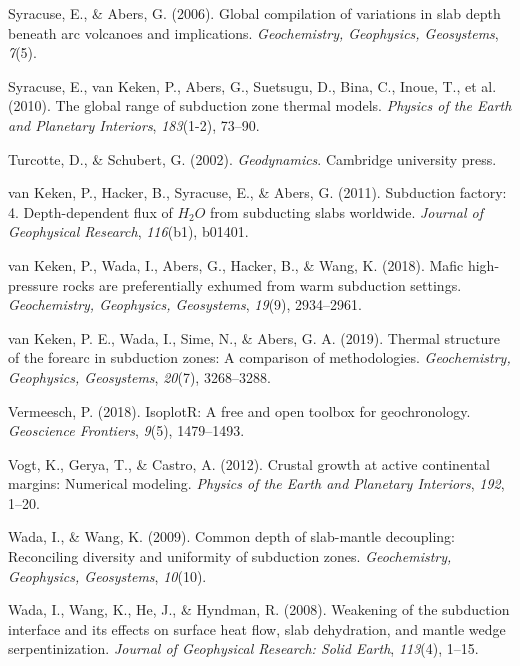 \begin{CSLReferences}{1}{1}
\leavevmode{}%
Syracuse, E., \& Abers, G. (2006). Global compilation of variations in slab depth beneath arc volcanoes and implications. \emph{Geochemistry, Geophysics, Geosystems}, \emph{7}(5).

\leavevmode{}%
Syracuse, E., van Keken, P., Abers, G., Suetsugu, D., Bina, C., Inoue, T., et al. (2010). The global range of subduction zone thermal models. \emph{Physics of the Earth and Planetary Interiors}, \emph{183}(1-2), 73--90.

\leavevmode{}%
Turcotte, D., \& Schubert, G. (2002). \emph{Geodynamics}. Cambridge university press.

\leavevmode{}%
van Keken, P., Hacker, B., Syracuse, E., \& Abers, G. (2011). Subduction factory: 4. Depth-dependent flux of \(H_2O\) from subducting slabs worldwide. \emph{Journal of Geophysical Research}, \emph{116}(b1), b01401.

\leavevmode{}%
van Keken, P., Wada, I., Abers, G., Hacker, B., \& Wang, K. (2018). Mafic high-pressure rocks are preferentially exhumed from warm subduction settings. \emph{Geochemistry, Geophysics, Geosystems}, \emph{19}(9), 2934--2961.

\leavevmode{}%
van Keken, P. E., Wada, I., Sime, N., \& Abers, G. A. (2019). Thermal structure of the forearc in subduction zones: A comparison of methodologies. \emph{Geochemistry, Geophysics, Geosystems}, \emph{20}(7), 3268--3288.

\leavevmode{}%
Vermeesch, P. (2018). IsoplotR: A free and open toolbox for geochronology. \emph{Geoscience Frontiers}, \emph{9}(5), 1479--1493.

\leavevmode{}%
Vogt, K., Gerya, T., \& Castro, A. (2012). Crustal growth at active continental margins: Numerical modeling. \emph{Physics of the Earth and Planetary Interiors}, \emph{192}, 1--20.

\leavevmode{}%
Wada, I., \& Wang, K. (2009). Common depth of slab-mantle decoupling: Reconciling diversity and uniformity of subduction zones. \emph{Geochemistry, Geophysics, Geosystems}, \emph{10}(10).

\leavevmode{}%
Wada, I., Wang, K., He, J., \& Hyndman, R. (2008). Weakening of the subduction interface and its effects on surface heat flow, slab dehydration, and mantle wedge serpentinization. \emph{Journal of Geophysical Research: Solid Earth}, \emph{113}(4), 1--15.


\end{CSLReferences}
